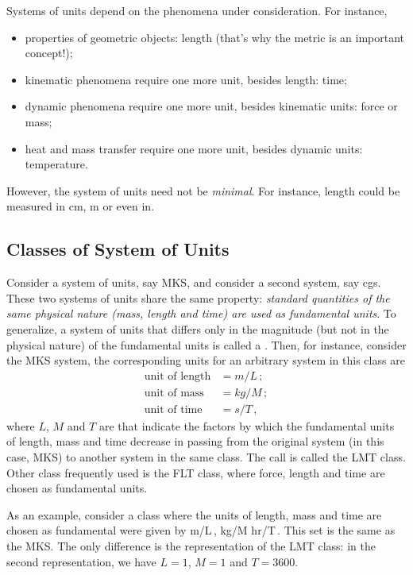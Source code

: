 Systems of units depend on the phenomena under consideration. For instance, 
\begin{itemize}
\item properties of geometric objects: length (that's why the metric is an important concept!);
\item kinematic phenomena require one more unit, besides length: time;
\item dynamic phenomena require one more unit, besides kinematic units: force or mass;
\item heat and mass transfer require one more unit, besides dynamic units: temperature.
\end{itemize}

However, the system of units need not be \emph{minimal}. For instance, length could be measured in \si{cm}, \si{m} or even \si{in}.


\subsection{Classes of System of Units}
Consider a system of units, say MKS, and consider a second system, say cgs. These two systems of units share the same property: \emph{standard quantities of the same physical nature (mass, length and time) are used as fundamental units}. To generalize, a system of units that differs only in the magnitude (but not in the physical nature) of the fundamental units is called a . Then, for instance, consider the MKS system, the corresponding units for an arbitrary system in this class are
\begin{align*}
\text{unit of length} &= \si{m}/L\,;\\
\text{unit of mass} &= \si{kg}/M\,;\\
\text{unit of time} &= \si{s}/T\,,
\end{align*}
where $L$, $M$ and $T$ are  that indicate the factors by which the fundamental units of length, mass and time decrease in passing from the original system (in this case, MKS) to another system in the same class. The call is called the LMT class. Other class frequently used is the FLT class, where force, length and time are chosen as fundamental units.

As an example, consider a class where the units of length, mass and time are chosen as fundamental were given by
\beq
\si{m}/L\,,\qquad
\si{kg}/M\qquad{}\qquad
\si{hr}/T\,.
\eeq
This set is the same as the MKS. The only difference is the representation of the LMT class: in the second representation, we have $L = 1$, $M = 1$ and $T = 3600$.


